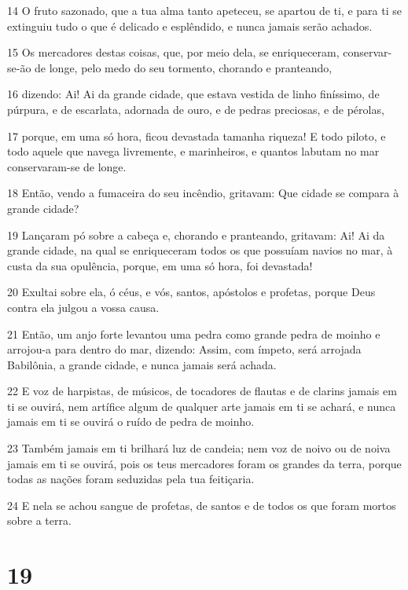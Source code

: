 \par 14 O fruto sazonado, que a tua alma tanto apeteceu, se apartou de ti, e para ti se extinguiu tudo o que é delicado e esplêndido, e nunca jamais serão achados.
\par 15 Os mercadores destas coisas, que, por meio dela, se enriqueceram, conservar-se-ão de longe, pelo medo do seu tormento, chorando e pranteando,
\par 16 dizendo: Ai! Ai da grande cidade, que estava vestida de linho finíssimo, de púrpura, e de escarlata, adornada de ouro, e de pedras preciosas, e de pérolas,
\par 17 porque, em uma só hora, ficou devastada tamanha riqueza! E todo piloto, e todo aquele que navega livremente, e marinheiros, e quantos labutam no mar conservaram-se de longe.
\par 18 Então, vendo a fumaceira do seu incêndio, gritavam: Que cidade se compara à grande cidade?
\par 19 Lançaram pó sobre a cabeça e, chorando e pranteando, gritavam: Ai! Ai da grande cidade, na qual se enriqueceram todos os que possuíam navios no mar, à custa da sua opulência, porque, em uma só hora, foi devastada!
\par 20 Exultai sobre ela, ó céus, e vós, santos, apóstolos e profetas, porque Deus contra ela julgou a vossa causa.
\par 21 Então, um anjo forte levantou uma pedra como grande pedra de moinho e arrojou-a para dentro do mar, dizendo: Assim, com ímpeto, será arrojada Babilônia, a grande cidade, e nunca jamais será achada.
\par 22 E voz de harpistas, de músicos, de tocadores de flautas e de clarins jamais em ti se ouvirá, nem artífice algum de qualquer arte jamais em ti se achará, e nunca jamais em ti se ouvirá o ruído de pedra de moinho.
\par 23 Também jamais em ti brilhará luz de candeia; nem voz de noivo ou de noiva jamais em ti se ouvirá, pois os teus mercadores foram os grandes da terra, porque todas as nações foram seduzidas pela tua feitiçaria.
\par 24 E nela se achou sangue de profetas, de santos e de todos os que foram mortos sobre a terra.

\chapter{19}

